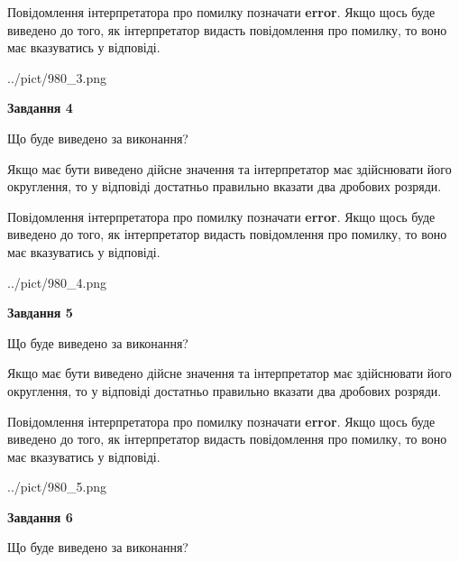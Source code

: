 \documentclass[12pt, ukrainian]{article}
\begin{document}
{\begin {Large}
Повідомлення інтерпретатора про помилку позначати \textbf{error}.
Якщо щось буде виведено до того, як інтерпретатор видасть повідомлення про помилку, 
то воно має вказуватись у відповіді. \par

\begin{center}
	{../pict/980_3.png}
\end{center}
\newpage

{\begin {center}\textbf{Завдання 4}\end {center}}\par
Що буде виведено за виконання? \par

Якщо має бути виведено дійсне значення та інтерпретатор має здійснювати його округлення, 
то у відповіді достатньо правильно вказати два дробових розряди.

Повідомлення інтерпретатора про помилку позначати \textbf{error}.
Якщо щось буде виведено до того, як інтерпретатор видасть повідомлення про помилку, 
то воно має вказуватись у відповіді. \par

\begin{center}
	{../pict/980_4.png}
\end{center}
\newpage

{\begin {center}\textbf{Завдання 5}\end {center}}\par
Що буде виведено за виконання? \par

Якщо має бути виведено дійсне значення та інтерпретатор має здійснювати його округлення, 
то у відповіді достатньо правильно вказати два дробових розряди.

Повідомлення інтерпретатора про помилку позначати \textbf{error}.
Якщо щось буде виведено до того, як інтерпретатор видасть повідомлення про помилку, 
то воно має вказуватись у відповіді. \par

\begin{center}
	{../pict/980_5.png}
\end{center}
\newpage

{\begin {center}\textbf{Завдання 6}\end {center}}\par
Що буде виведено за виконання? \par


\end{Large}}
\end{document}
